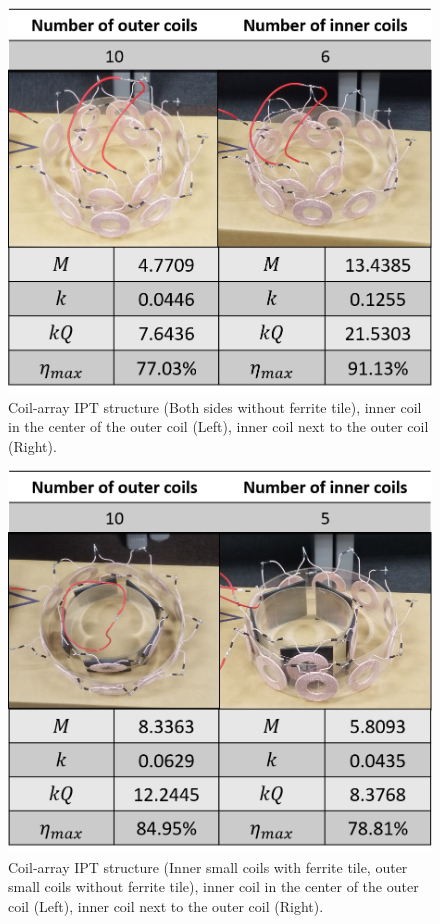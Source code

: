 \begin{figure}[htbp]
    \centering
    \includegraphics[width=0.6\linewidth]{images/4_coil_6_10_without_ferrite.png}
    \caption{Coil-array IPT structure (Both sides without ferrite tile), inner coil in the center of the outer coil (Left), inner coil next to the outer coil (Right).}
\end{figure}
\begin{figure}[htbp]
    \centering
    \includegraphics[width=0.6\linewidth]{images/4_coil_6_10_inner_with_ferrite.png}
    \caption{Coil-array IPT structure (Inner small coils with ferrite tile, outer small coils without ferrite tile), inner coil in the center of the outer coil (Left), inner coil next to the outer coil (Right).}
\end{figure}

